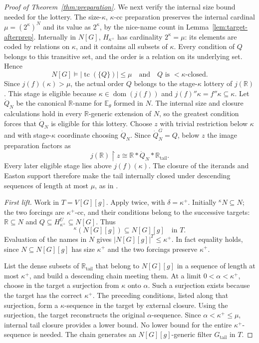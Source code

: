 \documentclass[11pt,a4paper]{amsart}
\theoremstyle{definition}
\theoremstyle{remark}
\newcommand{\RR}{\mathbb R}
\newcommand{\EE}{\mathbb E}
\DeclareMathOperator{\dom}{dom}
\DeclareMathOperator{\tc}{tc}
\begin{document}
\begin{proof}[Proof of Theorem~\ref{thm:preparation}]
We next verify the internal size bound needed for the
lottery. The size-\(\kappa\), \(\kappa\)-cc preparation
preserves the internal cardinal
\(\mu=(2^\kappa)^N\) and its value as \(2^\kappa\),
by the nice-name count in
Lemma~\ref{lem:target-afterprep}. Internally in \(N[G]\),
\(H_{\kappa^+}\) has cardinality \(2^\kappa=\mu\):
its elements are coded by relations on \(\kappa\),
and it contains all subsets of \(\kappa\). Every
condition of \(Q\) belongs to this transitive set,
and the order is a relation on its underlying set.
Hence
\[
 N[G]\models |\tc(\{Q\})|\leq\mu
                   \quad\text{and}\quad
                   Q\text{ is }<\kappa\text{-closed}.
\]
Since \(j(f)(\kappa)>\mu\), the actual order \(Q\)
belongs to the stage-\(\kappa\) lottery of \(j(\RR)\).
This stage is eligible because
\(\kappa\in\dom(j(f))\) and
\(j(f)''\kappa=f''\kappa\subseteq\kappa\).
Let \(\dot Q_N\) be the canonical \(\RR\)-name for
\(\EE_\theta\) formed in \(N\). The internal size
and closure calculations hold in every
\(\RR\)-generic extension of \(N\), so the greatest
condition forces that \(\dot Q_N\) is eligible for
this lottery. Choose \(z\) with trivial restriction
below \(\kappa\) and with stage-\(\kappa\) coordinate
choosing \(\dot Q_N\). Since \(\dot Q_N^G=Q\), below
\(z\) the image preparation factors as
\[
 j(\RR)\restriction z
       \cong\RR*\dot Q_N*\RR_{\mathrm{tail}}.
\]
Every later eligible stage lies above
\(j(f)(\kappa)\). The closure of the iterands and
Easton support therefore make the tail internally
closed under descending sequences of length at most
\(\mu\), as in \cite[p.~1229]{Johnstone}.

\emph{First lift.} Work in \(T=V[G][g]\). Apply
\cite[Fact 14(3)]{Johnstone} twice, with
\(\delta=\kappa^+\). Initially
\({}^\kappa N\subseteq N\); the two forcings are
\(\kappa^+\)-cc, and their conditions belong to the
successive targets:
\(\RR\subseteq N\) and
\(Q\subseteq H_{\kappa^+}^U\subseteq N[G]\).
Thus
\[
 {}^\kappa(N[G][g])\subseteq N[G][g]
                                           \quad\text{in }T.
\]
Evaluation of the names in \(N\) gives
\(|N[G][g]|^T\leq\kappa^+\). In fact equality holds,
since \(N\subseteq N[G][g]\) has size \(\kappa^+\)
and the two forcings preserve \(\kappa^+\).

List the dense subsets of \(\RR_{\mathrm{tail}}\) that belong
to \(N[G][g]\) in a sequence of length at most \(\kappa^+\),
and build a descending chain meeting them. At a limit
\(0<\alpha<\kappa^+\), choose in the target a
surjection from \(\kappa\) onto \(\alpha\). Such a
surjection exists because the target has the correct
\(\kappa^+\). The preceding conditions, listed along
that surjection, form a \(\kappa\)-sequence in the
target by external closure. Using the surjection,
the target reconstructs the original
\(\alpha\)-sequence. Since \(\alpha<\kappa^+\leq\mu\),
internal tail closure provides a lower bound. No
lower bound for the entire \(\kappa^+\)-sequence is
needed. The chain generates an
\(N[G][g]\)-generic filter \(G_{\mathrm{tail}}\) in
\(T\).


\end{proof}
\end{document}
